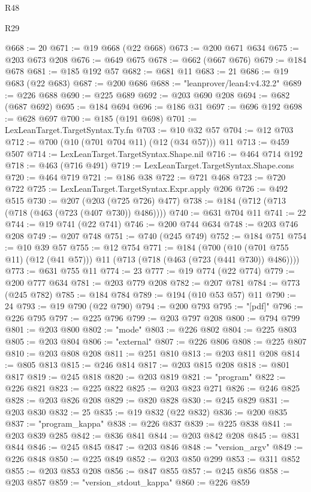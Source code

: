 \begin{lexlean}{R48}
\begin{lexlean}{R29}
\begin{coremodule}
{{{{{{{{{{{{{{{{{{{{{{{{{{{{{{{{{{{{{{{{{{{{{{{{{{{{{{{{{{{{{{{{{{{{{{{{{{{{{{{{{{{{{{{{{{{{{{{{{{{{{{{{{{{{{{{{{{{{{{{{{{{{{{{{{{{{{{{{{{{{{{{{{{{{{{{{{{{{{{{{{{{{{{{{{{{{{{{{{{{{{{{{{{{{{{{{{{{{{{{{{{{{{{{{{{{{{{{{{{@668 := 20
@671 := @19 @668 (@22 @668)
@673 := @200 @671 @634
@675 := @203 @673 @208
@676 := @649 @675
@678 := @662 (@667 @676)
@679 := @184 @678
@681 := @185 @192 @57
@682 := @681 @11
@683 := 21
@686 := @19 @683 (@22 @683)
@687 := @200 @686
@688 := "leanprover/lean4:v4.32.2"
@689 := @226 @688
@690 := @225 @689
@692 := @203 @690 @208
@694 := @682 (@687 @692)
@695 := @184 @694
@696 := @186 @31
@697 := @696 @192
@698 := @628 @697
@700 := @185 (@191 @698)
@701 := LexLeanTarget.TargetSyntax.Ty.fn
@703 := @10 @32 @57
@704 := @12 @703
@712 := @700 (@10 (@701 @704 @11) (@12 (@34 @57))) @11
@713 := @459 @507
@714 := LexLeanTarget.TargetSyntax.Shape.nil
@716 := @464 @714 @192
@718 := @463 (@716 @491)
@719 := LexLeanTarget.TargetSyntax.Shape.cons
@720 := @464 @719
@721 := @186 @38
@722 := @721 @468
@723 := @720 @722
@725 := LexLeanTarget.TargetSyntax.Expr.apply @206
@726 := @492 @515
@730 := @207 (@203 (@725 @726) @477)
@738 := @184 (@712 (@713 (@718 (@463 (@723 (@407 @730)) @486))))
@740 := @631 @704 @11
@741 := 22
@744 := @19 @741 (@22 @741)
@746 := @200 @744 @634
@748 := @203 @746 @208
@749 := @207 @748
@751 := @740 (@245 @749)
@752 := @184 @751
@754 := @10 @39 @57
@755 := @12 @754
@771 := @184
    (@700 (@10 (@701 @755 @11) (@12 (@41 @57))) @11 (@713 (@718 (@463 (@723 (@441 @730)) @486))))
@773 := @631 @755 @11
@774 := 23
@777 := @19 @774 (@22 @774)
@779 := @200 @777 @634
@781 := @203 @779 @208
@782 := @207 @781
@784 := @773 (@245 @782)
@785 := @184 @784
@789 := @194 (@10 @53 @57) @11
@790 := 24
@793 := @19 @790 (@22 @790)
@794 := @200 @793
@795 := "[pdf]"
@796 := @226 @795
@797 := @225 @796
@799 := @203 @797 @208
@800 := @794 @799
@801 := @203 @800
@802 := "mode"
@803 := @226 @802
@804 := @225 @803
@805 := @203 @804
@806 := "external"
@807 := @226 @806
@808 := @225 @807
@810 := @203 @808 @208
@811 := @251 @810
@813 := @203 @811 @208
@814 := @805 @813
@815 := @246 @814
@817 := @203 @815 @208
@818 := @801 @817
@819 := @245 @818
@820 := @203 @819
@821 := "program"
@822 := @226 @821
@823 := @225 @822
@825 := @203 @823 @271
@826 := @246 @825
@828 := @203 @826 @208
@829 := @820 @828
@830 := @245 @829
@831 := @203 @830
@832 := 25
@835 := @19 @832 (@22 @832)
@836 := @200 @835
@837 := "program_kappa"
@838 := @226 @837
@839 := @225 @838
@841 := @203 @839 @285
@842 := @836 @841
@844 := @203 @842 @208
@845 := @831 @844
@846 := @245 @845
@847 := @203 @846
@848 := "version_argv"
@849 := @226 @848
@850 := @225 @849
@852 := @203 @850 @299
@853 := @311 @852
@855 := @203 @853 @208
@856 := @847 @855
@857 := @245 @856
@858 := @203 @857
@859 := "version_stdout_kappa"
@860 := @226 @859
}}}}}}}}}}}}}}}}}}}}}}}}}}}}}}}}}}}}}}}}}}}}}}}}}}}}}}}}}}}}}}}}}}}}}}}}}}}}}}}}}}}}}}}}}}}}}}}}}}}}}}}}}}}}}}}}}}}}}}}}}}}}}}}}}}}}}}}}}}}}}}}}}}}}}}}}}}}}}}}}}}}}}}}}}}}}}}}}}}}}}}}}}}}}}}}}}}}}}}}}}}}}}}}}}}}}}}}}}}
\end{coremodule}
\end{lexlean}
\end{lexlean}
